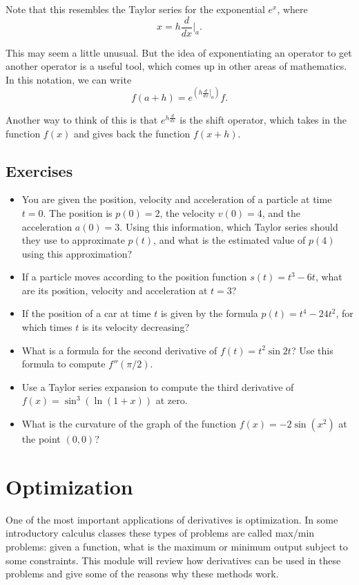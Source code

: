 \documentclass[twoside,openright,titlepage,a4paper]{book}
\begin{document}
\begin{sloppypar}
Note that this resembles the Taylor series for the exponential $e^x$, where \[ x = h \frac{d}{dx} \bigg|_a. \]

This may seem a little unusual. But the idea of exponentiating an operator to get another operator is a useful tool, which comes up in other areas of mathematics. In this notation, we can write \[ f(a+h) = e^{\left(h\left.\frac{d}{dx}\right|_a\right)} f. \]

Another way to think of this is that $e^{h \frac{d}{dx}}$ is the shift operator, which takes in the function $f(x)$ and gives back the function $f(x+h)$.

\subsection{Exercises}

\begin{itemize}
\item You are given the position, velocity and acceleration of a particle at time $t = 0$. The position is $p(0) = 2$, the velocity $v(0) = 4$, and the acceleration $a(0) = 3$. Using this information, which Taylor series should they use to approximate $p(t)$, and what is the estimated value of $p(4)$ using this approximation?
\item If a particle moves according to the position function $s(t) = t^3-6t$, what are its position, velocity and acceleration at $t=3$?
\item If the position of a car at time $t$ is given by the formula $p(t) = t^4 - 24t^2$, for which times $t$ is its velocity decreasing?
\item What is a formula for the second derivative of $f(t) = t^2\sin 2t$? Use this formula to compute $f''(\pi/2)$.
\item Use a Taylor series expansion to compute the third derivative of $f(x) = \sin^3 \left(\ln(1+x) \right)$ at zero.
\item What is the curvature of the graph of the function $f(x) = -2\sin(x^2)$ at the point $(0,0)$?
\end{itemize}

\section{Optimization} \label{ChDifferentiationSecOptimization}

One of the most important applications of derivatives is optimization. In some introductory calculus classes these types of problems are called max/min problems: given a function, what is the maximum or minimum output subject to some constraints. This module will review how derivatives can be used in these problems and give some of the reasons why these methods work.


\end{sloppypar}
\end{document}
